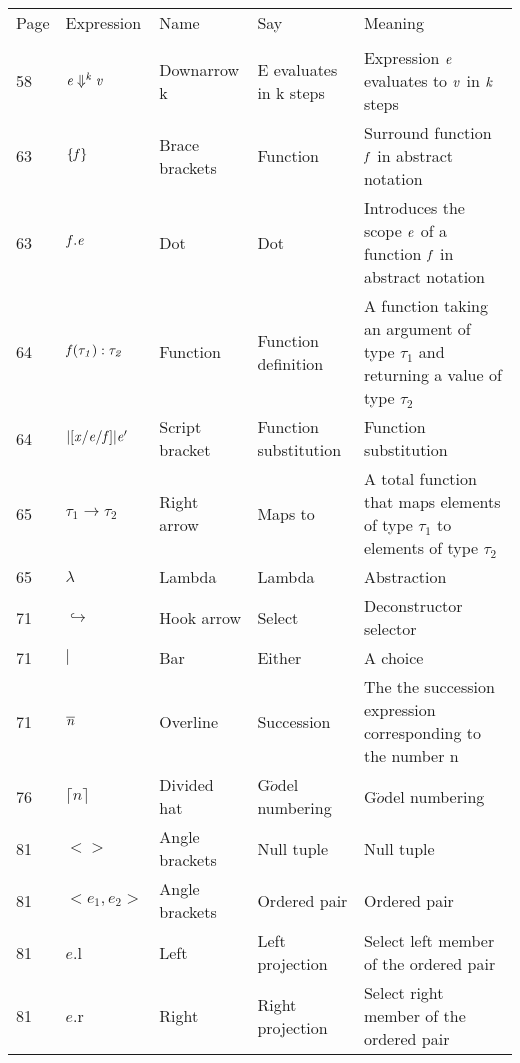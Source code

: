 \documentclass[12pt]{article}
\begin{document}
\begin{tabular}[b] {p{} p{} p{} p{} p{}}
Page & Expression & Name & Say & Meaning \\ \\

58 & $\it{e} \Downarrow ^{\it{k}}\it{v}$  & Downarrow k & E evaluates in k steps & Expression $ \it{e}$ evaluates to $\it{v}$ in $\it{k}$ steps\\

63 & $\{\it{f}\}$ & Brace brackets & Function & Surround function $\it{f}$ in abstract notation \\

63 & $\it{f}.\it{e}$ & Dot & Dot & Introduces the scope $\it{e}$ of a function $\it{f}$ in abstract notation \\
64 & $\it{f}(\tau_1):\tau_2$ & Function & Function definition & A function taking an argument of type $\tau_1$ and returning a value of type $\tau_2$ \\

64 & $\mathcal{|[}\it{x/e/f}\mathcal{]|}\it{e'}$ & Script bracket & Function substitution & Function substitution \\

65 & $\tau_1 \to \tau_2$ & Right arrow & Maps to & A total function that maps elements of type $\tau_1$ to elements of type $\tau_2$ \\
65 & $\lambda $ & Lambda & Lambda & Abstraction \\
71 & $\hookrightarrow$ & Hook arrow & Select & Deconstructor selector \\
71 & $|$ & Bar & Either & A choice \\
71 & $\overline{\it{n}}$ & Overline & Succession & The the succession expression corresponding to the number n \\
76 & $\lceil n \rceil$ & Divided hat & G$\ddot{o}$del numbering & G$\ddot{o}$del numbering \\

81 & $<>$ & Angle brackets & Null tuple & Null tuple \\
81 & $<e_1,e_2>$ & Angle brackets & Ordered pair & Ordered pair \\
81 & $e.$l & Left & Left projection & Select left member of the ordered pair \\
81 & $e.$r & Right & Right projection & Select right member of the ordered pair \\


\end{tabular}
\end{document}
